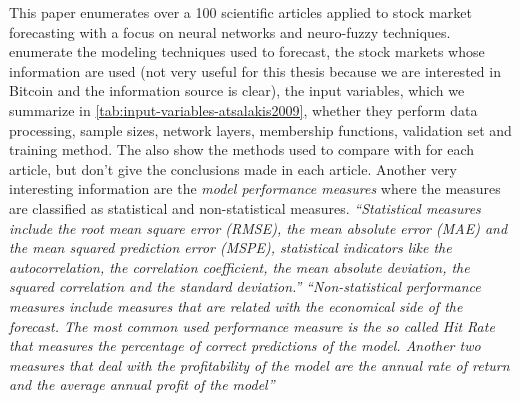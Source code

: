 This paper enumerates over a 100 scientific articles applied to stock
market forecasting with a focus on neural networks and neuro-fuzzy
techniques. \cite{atsalakis2009surveying} enumerate the modeling
techniques used to forecast, the stock markets whose information are
used (not very useful for this thesis because we are interested in
Bitcoin and the information source is clear), the input variables,
which we summarize in \autoref{tab:input-variables-atsalakis2009},
whether they perform data processing, sample sizes, network layers,
membership functions, validation set and training method. The also
show the methods used to compare with for each article, but don't give
the conclusions made in each article. Another very interesting
information are the \textit{model performance measures} where the
measures are classified as statistical and non-statistical measures.
\textit{``Statistical measures include the root mean square error
  (RMSE), the mean absolute error (MAE) and the mean squared
  prediction error (MSPE), statistical indicators like the
  autocorrelation, the correlation coefficient, the mean absolute
  deviation, the squared correlation and the standard deviation.''}
\textit{``Non-statistical performance measures include measures that
  are related with the economical side of the forecast. The most
  common used performance measure is the so called Hit Rate that
  measures the percentage of correct predictions of the model. Another
  two measures that deal with the profitability of the model are the
  annual rate of return and the average annual profit of the model''}

